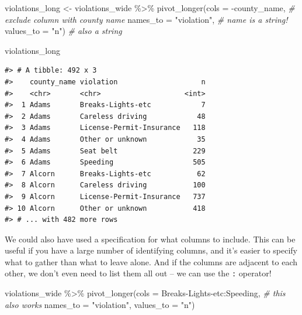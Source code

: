 \documentclass[
]{book}
\newenvironment{Shaded}{\begin{snugshade}}{\end{snugshade}}
\newcommand{\AttributeTok}[1]{\textcolor[rgb]{0.77,0.63,0.00}{#1}}
\newcommand{\CommentTok}[1]{\textcolor[rgb]{0.56,0.35,0.01}{\textit{#1}}}
\newcommand{\FunctionTok}[1]{\textcolor[rgb]{0.00,0.00,0.00}{#1}}
\newcommand{\NormalTok}[1]{#1}
\newcommand{\OtherTok}[1]{\textcolor[rgb]{0.56,0.35,0.01}{#1}}
\newcommand{\SpecialCharTok}[1]{\textcolor[rgb]{0.00,0.00,0.00}{#1}}
\newcommand{\StringTok}[1]{\textcolor[rgb]{0.31,0.60,0.02}{#1}}
\begin{document}
\begin{Shaded}
\begin{Highlighting}[]
\NormalTok{violations\_long }\OtherTok{\textless{}{-}}\NormalTok{ violations\_wide }\SpecialCharTok{\%\textgreater{}\%}
  \FunctionTok{pivot\_longer}\NormalTok{(}\AttributeTok{cols =} \SpecialCharTok{{-}}\NormalTok{county\_name,        }\CommentTok{\# exclude column with county name}
               \AttributeTok{names\_to =} \StringTok{"violation"}\NormalTok{,     }\CommentTok{\# name is a string!}
               \AttributeTok{values\_to =} \StringTok{"n"}\NormalTok{)            }\CommentTok{\# also a string}

\NormalTok{violations\_long}
\end{Highlighting}
\end{Shaded}

\begin{verbatim}
#> # A tibble: 492 x 3
#>    county_name violation                    n
#>    <chr>       <chr>                    <int>
#>  1 Adams       Breaks-Lights-etc            7
#>  2 Adams       Careless driving            48
#>  3 Adams       License-Permit-Insurance   118
#>  4 Adams       Other or unknown            35
#>  5 Adams       Seat belt                  229
#>  6 Adams       Speeding                   505
#>  7 Alcorn      Breaks-Lights-etc           62
#>  8 Alcorn      Careless driving           100
#>  9 Alcorn      License-Permit-Insurance   737
#> 10 Alcorn      Other or unknown           418
#> # ... with 482 more rows
\end{verbatim}

We could also have used a specification for what columns to include. This can be
useful if you have a large number of identifying columns, and it's easier to
specify what to gather than what to leave alone. And if the columns are adjacent to each other, we don't even need to list them all out -- we can use the \texttt{:} operator!

\begin{Shaded}
\begin{Highlighting}[]
\NormalTok{violations\_wide }\SpecialCharTok{\%\textgreater{}\%}
  \FunctionTok{pivot\_longer}\NormalTok{(}\AttributeTok{cols =} \StringTok{\textasciigrave{}}\AttributeTok{Breaks{-}Lights{-}etc}\StringTok{\textasciigrave{}}\SpecialCharTok{:}\NormalTok{Speeding,      }\CommentTok{\# this also works}
               \AttributeTok{names\_to =} \StringTok{"violation"}\NormalTok{, }
               \AttributeTok{values\_to =} \StringTok{"n"}\NormalTok{)}
\end{Highlighting}
\end{Shaded}
\end{document}
